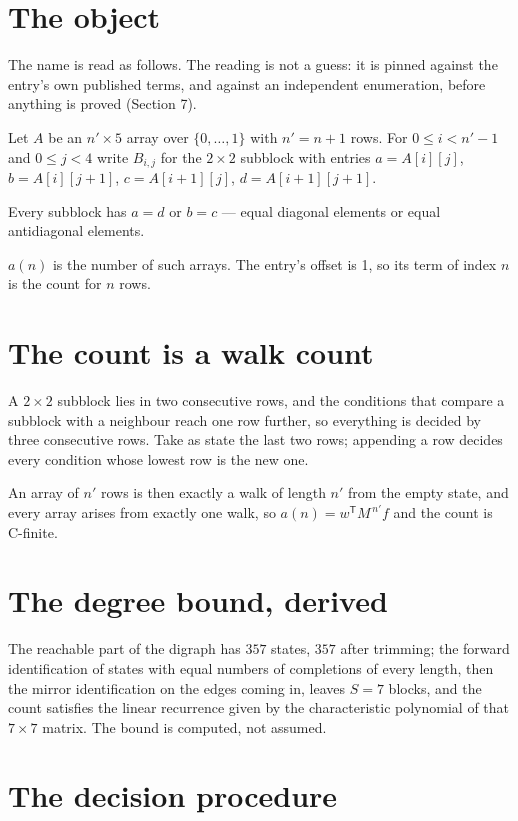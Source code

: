 \documentclass[11pt]{article}
\theoremstyle{definition}
\begin{document}
\section{The object}

The name is read as follows. The reading is not a guess: it is pinned against the entry's own published terms, and against an independent enumeration, before anything is proved (Section 7).

Let $A$ be an $n' \times 5$ array over $\{0,\dots,1\}$ with $n' = n + 1$ rows. For $0 \le i < n'-1$ and $0 \le j < 4$ write $B_{i,j}$ for the $2\times2$ subblock with entries $a = A[i][j]$, $b = A[i][j{+}1]$, $c = A[i{+}1][j]$, $d = A[i{+}1][j{+}1]$.

Every subblock has $a = d$ or $b = c$ --- equal diagonal elements or equal antidiagonal elements.

$a(n)$ is the number of such arrays. The entry's offset is 1, so its term of index $n$ is the count for $n$ rows.

\section{The count is a walk count}

A $2\times2$ subblock lies in two consecutive rows, and the conditions that compare a subblock with a neighbour reach one row further, so everything is decided by three consecutive rows. Take as state the last two rows; appending a row decides every condition whose lowest row is the new one.

An array of $n'$ rows is then exactly a walk of length $n'$ from the empty state, and every array arises from exactly one walk, so $a(n) = w^{\mathsf T}M^{\,n'}f$ and the count is C-finite.

\section{The degree bound, derived}

The reachable part of the digraph has $357$ states, $357$ after trimming; the forward identification of states with equal numbers of completions of every length, then the mirror identification on the edges coming in, leaves $S = 7$ blocks, and the count satisfies the linear recurrence given by the characteristic polynomial of that $7\times7$ matrix. The bound is computed, not assumed.

\section{The decision procedure}
\end{document}
